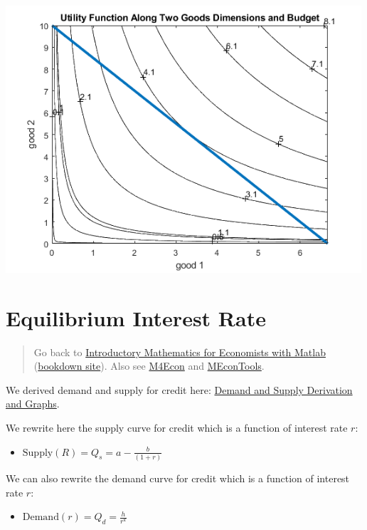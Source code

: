 \documentclass[
]{book}
\providecommand{\tightlist}{%
  \setlength{\itemsep}{0pt}\setlength{\parskip}{0pt}}
\begin{document}
\includegraphics[width=5.20833in,height=\textheight]{img/twogoods_images/figure_2.png}

\hypertarget{equilibrium-interest-rate}{%
\section{Equilibrium Interest Rate}\label{equilibrium-interest-rate}}

\begin{quote}
Go back to \href{https://math4econ.github.io/}{Introductory Mathematics for Economists with Matlab} (\href{https://math4econ.github.io/bookdown}{bookdown site}). Also see \href{http://fanwangecon.github.io/M4Econ}{M4Econ} and \href{https://fanwangecon.github.io/MEconTools/}{MEconTools}.
\end{quote}

We derived demand and supply for credit here: \href{https://math4econ.github.io/derivative_application/K_borrow_firm.html}{Demand and Supply
Derivation and
Graphs}.

We rewrite here the supply curve for credit which is a function of
interest rate \(r\):

\begin{itemize}
\tightlist
\item
  \(\displaystyle \textrm{Supply}(R)=Q_s =a-\frac{b}{(1+r)}\)
\end{itemize}

We can also rewrite the demand curve for credit which is a function of
interest rate \(r\):

\begin{itemize}
\tightlist
\item
  \(\displaystyle \textrm{Demand}(r)=Q_d =\frac{h}{r^k }\)
\end{itemize}
\end{document}
